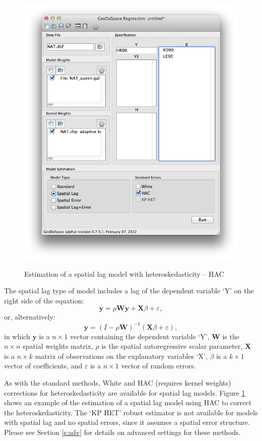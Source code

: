 \documentclass{article}
\begin{document}
\begin{figure}[htb]
\caption{Estimation of a spatial lag model with heteroskedasticity -- HAC}
\label{f:haclag}
\begin{center}
\includegraphics[width=0.7\linewidth]{haclag.png}\\
\end{center}
\end{figure}

The spatial lag type of model includes a lag of the dependent variable `Y' on the right side of the equation:
\begin{equation}
\mathbf{y} =  \rho \mathbf{W} \mathbf{y} + \mathbf{X}\beta + \varepsilon,
\end{equation}
or, alternatively:
\begin{equation}
\mathbf{y} =  (I - \rho \mathbf{W})^{-1} (\mathbf{X}\beta + \varepsilon),
\end{equation}
in which $\mathbf{y}$ is a $n \times 1$ vector containing the dependent variable `Y', $\mathbf{W}$ is the $n \times n$ spatial weights matrix, $\rho$ is the spatial autoregressive scalar parameter, $\mathbf{X}$ is a $n \times k$ matrix of observations on the explanatory variables `X', $\beta$ is a $k \times 1$ vector of coefficients, and $\varepsilon$ is a $n \times 1$ vector of random errors.

As with the standard methods, White and HAC (requires kernel weights) corrections for heteroskedasticity are available for spatial lag models. Figure \ref{f:haclag} shows an example of the estimation of a spatial lag model using HAC to correct the heteroskedasticity. The `KP HET' robust estimator is not available for models with spatial lag and no spatial errors, since it assumes a spatial error structure. Please see Section \ref{s:adv} for details on advanced settings for these methods.
\end{document}
